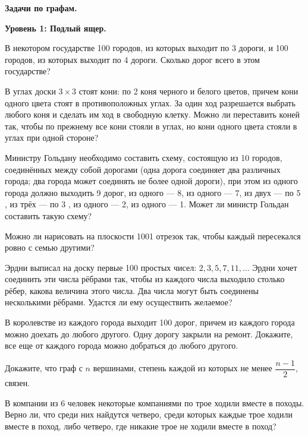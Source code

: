     \hspace{3mm}

\centerline{\bf \Huge  Задачи по графам.}
\centerline{\bf \Huge Уровень 1: Подлый ящер.}

 В некотором государстве 100 городов, из которых выходит по 3 дороги, и 100 городов, из которых выходит по 4 дороги. Сколько дорог всего в этом государстве?

 В углах доски $3\times3$ стоят кони: по 2 коня черного и белого цветов, причем кони одного цвета стоят в противоположных углах. За один ход разрешается выбрать любого коня и сделать им ход в свободную клетку. Можно ли переставить коней так, чтобы по прежнему все кони стояли в углах, но кони одного цвета стояли в углах при одной стороне?

 Министру Гольдану необходимо составить схему, состоящую из 10 городов, соединённых между собой дорогами (одна дорога соединяет два различных города; два города может соединять не более одной дороги), при этом из одного города должно выходить 9 дорог, из одного — 8, из одного — 7, из двух — по 5 ,    из трёх — по 3 , из одного — 2, из одного — 1. Может ли министр Гольдан составить такую схему?

 Можно ли нарисовать на плоскости 1001 отрезок так, чтобы каждый пересекался ровно с семью другими?

 Эрдни выписал на доску первые 100 простых чисел: $2, 3, 5, 7, 11,\dotsc$ Эрдни хочет соединить эти числа рёбрами так, чтобы из каждого числа выходило столько рёбер, какова величина этого числа. Два числа могут быть соединены несколькими рёбрами. Удастся ли ему осуществить желаемое?

 В королевстве из каждого города выходит 100 дорог, причем из каждого города можно доехать до любого другого. Одну дорогу закрыли на ремонт. Докажите, все еще от каждого города можно добраться до любого другого.

 Докажите, что граф с $n$ вершинами, степень каждой из которых не менее $\dfrac{n-1}{2}$, связен.

 В компании из 6 человек некоторые компаниями по трое ходили вместе в походы. Верно ли, что среди них найдутся четверо, среди которых каждые трое ходили вместе в поход, либо четверо, где никакие трое не ходили вместе в поход?

